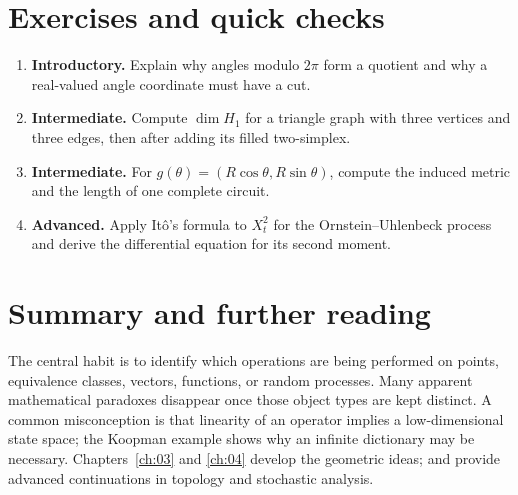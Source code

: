 \section*{Exercises and quick checks}
\begin{enumerate}
\item \textbf{Introductory.} Explain why angles modulo \(2\pi\) form a quotient and why a real-valued angle coordinate must have a cut.
\item \textbf{Intermediate.} Compute \(\dim H_1\) for a triangle graph with three vertices and three edges, then after adding its filled two-simplex.
\item \textbf{Intermediate.} For \(g(\theta)=(R\cos\theta,R\sin\theta)\), compute the induced metric and the length of one complete circuit.
\item \textbf{Advanced.} Apply It\^o's formula to \(X_t^2\) for the Ornstein--Uhlenbeck process and derive the differential equation for its second moment.
\end{enumerate}
\section*{Summary and further reading}
The central habit is to identify which operations are being performed on points, equivalence classes, vectors, functions, or random processes. Many apparent mathematical paradoxes disappear once those object types are kept distinct. A common misconception is that linearity of an operator implies a low-dimensional state space; the Koopman example shows why an infinite dictionary may be necessary. Chapters~\ref{ch:03} and \ref{ch:04} develop the geometric ideas; \citet{hatcher2002} and \citet{oksendal2003} provide advanced continuations in topology and stochastic analysis.
